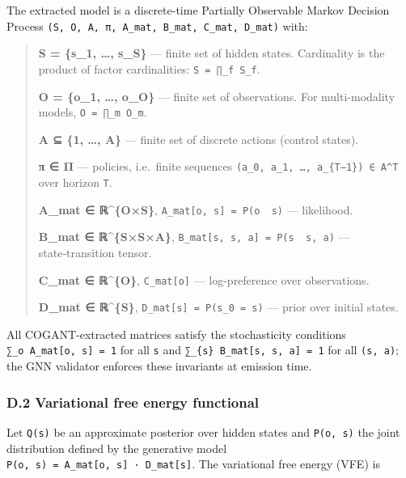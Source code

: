 \documentclass[
]{article}
\begin{document}
The extracted model is a discrete-time Partially Observable Markov
Decision Process
\texttt{(S,\ O,\ A,\ π,\ A\_mat,\ B\_mat,\ C\_mat,\ D\_mat)} with:

\begin{quote}
\textbf{S = \{s\_1, \ldots, s\_\mid S\mid\}} --- finite set of
hidden states. Cardinality is the product of factor cardinalities:
\texttt{\mid{}S\mid{}\ =\ ∏\_f\ \mid{}S\_f\mid{}}.

\textbf{O = \{o\_1, \ldots, o\_\mid O\mid\}} --- finite set of
observations. For multi-modality models,
\texttt{\mid{}O\mid{}\ =\ ∏\_m\ \mid{}O\_m\mid{}}.

\textbf{A ⊆ \{1, \ldots, \mid A\mid\}} --- finite set of
discrete actions (control states).

\textbf{π ∈ Π} --- policies, i.e.~finite sequences
\texttt{(a\_0,\ a\_1,\ …,\ a\_\{T−1\})\ ∈\ A\^{}T} over horizon
\texttt{T}.

\textbf{A\_mat ∈ ℝ\^{}\{\mid O\mid×\mid S\mid\}},
\texttt{A\_mat{[}o,\ s{]}\ =\ P(o\ \mid{}\ s)} --- likelihood.

\textbf{B\_mat ∈
ℝ\^{}\{\mid S\mid×\mid S\mid×\mid A\mid\}},
\texttt{B\_mat{[}s\textquotesingle{},\ s,\ a{]}\ =\ P(s\textquotesingle{}\ \mid{}\ s,\ a)}
--- state‑transition tensor.

\textbf{C\_mat ∈ ℝ\^{}\{\mid O\mid\}}, \texttt{C\_mat{[}o{]}}
--- log‑preference over observations.

\textbf{D\_mat ∈ ℝ\^{}\{\mid S\mid\}},
\texttt{D\_mat{[}s{]}\ =\ P(s\_0\ =\ s)} --- prior over initial states.
\end{quote}

All COGANT-extracted matrices satisfy the stochasticity conditions
\texttt{∑\_o\ A\_mat{[}o,\ s{]}\ =\ 1} for all \texttt{s} and
\texttt{∑\_\{s\textquotesingle{}\}\ B\_mat{[}s\textquotesingle{},\ s,\ a{]}\ =\ 1}
for all \texttt{(s,\ a)}; the GNN validator enforces these invariants at
emission time.

\subsubsection{D.2 Variational free energy
functional}\label{d.2-variational-free-energy-functional}

Let \texttt{Q(s)} be an approximate posterior over hidden states and
\texttt{P(o,\ s)} the joint distribution defined by the generative model
\texttt{P(o,\ s)\ =\ A\_mat{[}o,\ s{]}\ ·\ D\_mat{[}s{]}}. The
variational free energy (VFE) is
\end{document}
